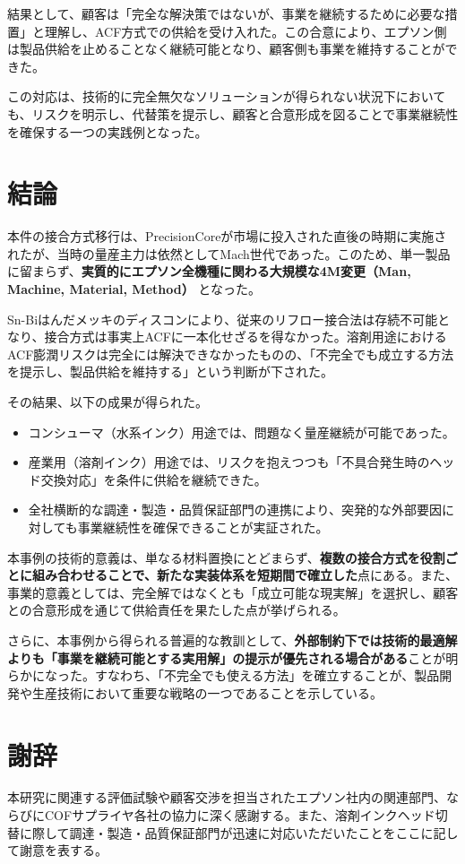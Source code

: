 \documentclass[conference]{IEEEtran}
\begin{document}
結果として、顧客は「完全な解決策ではないが、事業を継続するために必要な措置」と理解し、ACF方式での供給を受け入れた。この合意により、エプソン側は製品供給を止めることなく継続可能となり、顧客側も事業を維持することができた。  

この対応は、技術的に完全無欠なソリューションが得られない状況下においても、リスクを明示し、代替策を提示し、顧客と合意形成を図ることで事業継続性を確保する一つの実践例となった。

\section{結論}
本件の接合方式移行は、PrecisionCoreが市場に投入された直後の時期に実施されたが、当時の量産主力は依然としてMach世代であった。このため、単一製品に留まらず、\textbf{実質的にエプソン全機種に関わる大規模な4M変更（Man, Machine, Material, Method）} となった。  

Sn-Biはんだメッキのディスコンにより、従来のリフロー接合法は存続不可能となり、接合方式は事実上ACFに一本化せざるを得なかった。溶剤用途におけるACF膨潤リスクは完全には解決できなかったものの、「不完全でも成立する方法を提示し、製品供給を維持する」という判断が下された。  

その結果、以下の成果が得られた。  
\begin{itemize}
 \item コンシューマ（水系インク）用途では、問題なく量産継続が可能であった。  
 \item 産業用（溶剤インク）用途では、リスクを抱えつつも「不具合発生時のヘッド交換対応」を条件に供給を継続できた。  
 \item 全社横断的な調達・製造・品質保証部門の連携により、突発的な外部要因に対しても事業継続性を確保できることが実証された。  
\end{itemize}

本事例の技術的意義は、単なる材料置換にとどまらず、\textbf{複数の接合方式を役割ごとに組み合わせることで、新たな実装体系を短期間で確立した}点にある。また、事業的意義としては、完全解ではなくとも「成立可能な現実解」を選択し、顧客との合意形成を通じて供給責任を果たした点が挙げられる。  

さらに、本事例から得られる普遍的な教訓として、\textbf{外部制約下では技術的最適解よりも「事業を継続可能とする実用解」の提示が優先される場合がある}ことが明らかになった。すなわち、「不完全でも使える方法」を確立することが、製品開発や生産技術において重要な戦略の一つであることを示している。

\section*{謝辞}
本研究に関連する評価試験や顧客交渉を担当されたエプソン社内の関連部門、ならびにCOFサプライヤ各社の協力に深く感謝する。また、溶剤インクヘッド切替に際して調達・製造・品質保証部門が迅速に対応いただいたことをここに記して謝意を表する。
\end{document}
